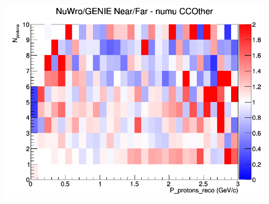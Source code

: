 \begin{figure}[h]
\endminipage
{}
\includegraphics[width=\linewidth]{eff_N_P/LAr/protons/ratios/CCOther_NuWro_GENIE_numu_NF_N_P.png}
\endminipage
\newline
\end{figure}
\clearpage
